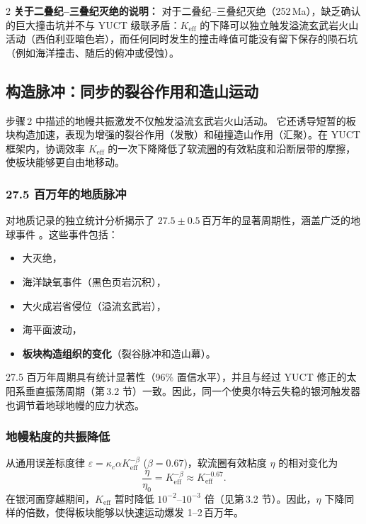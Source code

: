 \documentclass[11pt,a4paper]{article}
\begin{document}
\begin{multicols}{2}
		\noindent
		\textbf{关于二叠纪–三叠纪灭绝的说明：}
		对于二叠纪–三叠纪灭绝（252 Ma），缺乏确认的巨大撞击坑并不与 YUCT 级联矛盾：\(K_{\mathrm{eff}}\) 的下降可以独立触发溢流玄武岩火山活动（西伯利亚暗色岩），而任何同时发生的撞击峰值可能没有留下保存的陨石坑（例如海洋撞击、随后的俯冲或侵蚀）。
		
		\subsection{构造脉冲：同步的裂谷作用和造山运动}
		
		步骤 2 中描述的地幔共振激发不仅触发溢流玄武岩火山活动。
		它还诱导短暂的板块构造加速，表现为增强的裂谷作用（发散）和碰撞造山作用（汇聚）。在 YUCT 框架内，协调效率 \(K_{\mathrm{eff}}\) 的一次下降降低了软流圈的有效粘度和沿断层带的摩擦，使板块能够更自由地移动。
		
		\subsubsection{27.5 百万年的地质脉冲}
		
		对地质记录的独立统计分析揭示了 \(27.5 \pm 0.5\) 百万年的显著周期性，涵盖广泛的地球事件 \cite{Rampino2021,Rampino2023}。这些事件包括：
		\begin{itemize}
			\item 大灭绝，
			\item 海洋缺氧事件（黑色页岩沉积），
			\item 大火成岩省侵位（溢流玄武岩），
			\item 海平面波动，
			\item \textbf{板块构造组织的变化}（裂谷脉冲和造山幕）。
		\end{itemize}
		27.5 百万年周期具有统计显著性（96\% 置信水平），并且与经过 YUCT 修正的太阳系垂直振荡周期（第 3.2 节）一致。因此，同一个使奥尔特云失稳的银河触发器也调节着地球地幔的应力状态。
		
		\subsubsection{地幔粘度的共振降低}
		
		从通用误差标度律 \(\varepsilon = \kappa_c \alpha K_{\mathrm{eff}}^{-\beta}\) (\(\beta=0.67\))，软流圈有效粘度 \(\eta\) 的相对变化为
		\[
		\frac{\eta}{\eta_0} = K_{\mathrm{eff}}^{-\beta} \approx K_{\mathrm{eff}}^{-0.67}.
		\]
		在银河面穿越期间，\(K_{\mathrm{eff}}\) 暂时降低 \(10^{-2}\)–\(10^{-3}\) 倍（见第 3.2 节）。因此，\(\eta\) 下降同样的倍数，使得板块能够以快速运动爆发 1–2 百万年。
		

\end{multicols}
\end{document}

